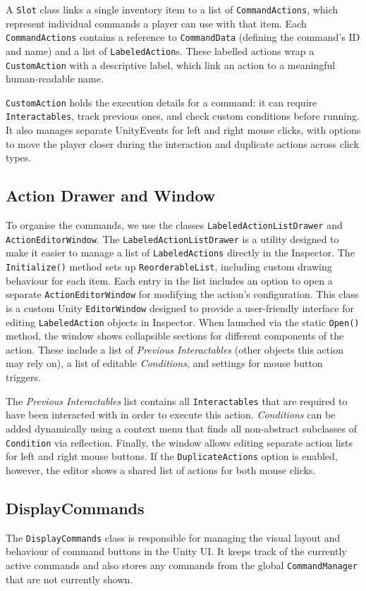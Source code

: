 A \verb|Slot| class links a single inventory item to a list of \verb|CommandActions|, which represent individual commands a player can use with that item. Each \verb|CommandActions| contains a reference to \verb|CommandData| (defining the command’s ID and name) and a list of \verb|LabeledAction|s. These labelled actions wrap a \verb|CustomAction| with a descriptive label, which link an action to a meaningful human-readable name.

\verb|CustomAction| holds the execution details for a command: it can require \verb|Interactables|, track previous ones, and check custom conditions before running. It also manages separate UnityEvents for left and right mouse clicks, with options to move the player closer during the interaction and duplicate actions across click types.


\subsection{Action Drawer and Window}
To organise the commands, we use the classes \verb|LabeledActionListDrawer| and \verb|ActionEditorWindow|. The \verb|LabeledActionListDrawer| is a utility designed to make it easier to manage a list of \verb|LabeledActions| directly in the Inspector. The \verb|Initialize()| method sets up \verb|ReorderableList|, including custom drawing behaviour for each item. Each entry in the list includes an option to open a separate \verb|ActionEditorWindow| for modifying the action’s configuration. This class is a custom Unity \verb|EditorWindow| designed to provide a user-friendly interface for editing \verb|LabeledAction| objects in Inspector. When launched via the static \verb|Open()| method, the window shows collapsible sections for different components of the action. These include a list of \textit{Previous Interactables} (other objects this action may rely on), a list of editable \textit{Conditions}, and settings for mouse button triggers.

The \textit{Previous Interactables} list contains all \verb|Interactables| that are required to have been interacted with in order to execute this action. \textit{Conditions} can be added dynamically using a context menu that finds all non-abstract subclasses of \verb|Condition| via reflection. Finally, the window allows editing separate action lists for left and right mouse buttons. If the \verb|DuplicateActions| option is enabled, however, the editor shows a shared list of actions for both mouse clicks. 

\subsection{DisplayCommands}
The \verb|DisplayCommands| class is responsible for managing the visual layout and behaviour of command buttons in the Unity UI. It keeps track of the currently active commands and also stores any commands from the global \verb|CommandManager| that are not currently shown. 

